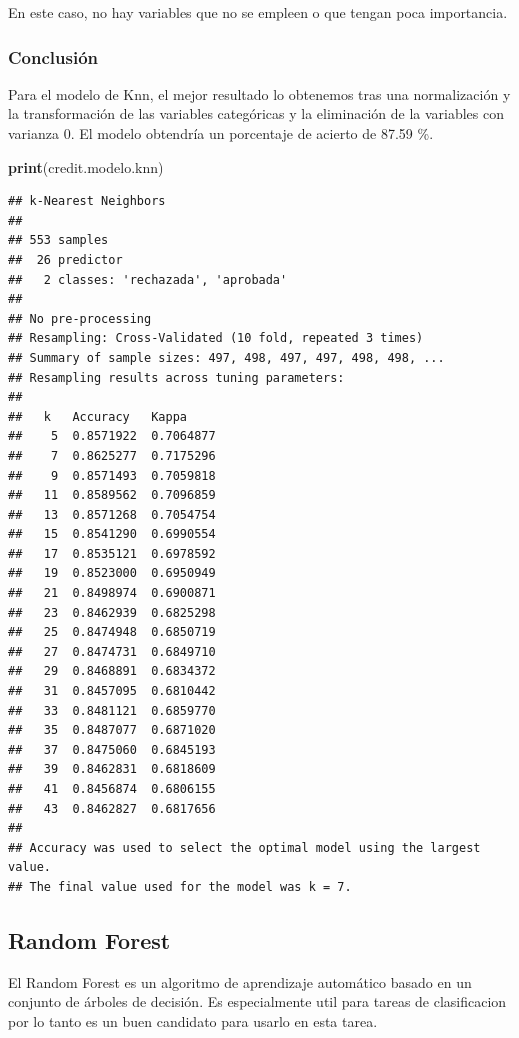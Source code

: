 \documentclass[
]{article}
\newenvironment{Shaded}{\begin{snugshade}}{\end{snugshade}}
\newcommand{\FunctionTok}[1]{\textcolor[rgb]{0.13,0.29,0.53}{\textbf{#1}}}
\newcommand{\NormalTok}[1]{#1}
\begin{document}
En este caso, no hay variables que no se empleen o que tengan poca
importancia.

\hypertarget{conclusiuxf3n-2}{%
\subsubsection{Conclusión}\label{conclusiuxf3n-2}}

Para el modelo de Knn, el mejor resultado lo obtenemos tras una
normalización y la transformación de las variables categóricas y la
eliminación de la variables con varianza 0. El modelo obtendría un
porcentaje de acierto de 87.59 \%.

\begin{Shaded}
\begin{Highlighting}[]
\FunctionTok{print}\NormalTok{(credit.modelo.knn)}
\end{Highlighting}
\end{Shaded}

\begin{verbatim}
## k-Nearest Neighbors 
## 
## 553 samples
##  26 predictor
##   2 classes: 'rechazada', 'aprobada' 
## 
## No pre-processing
## Resampling: Cross-Validated (10 fold, repeated 3 times) 
## Summary of sample sizes: 497, 498, 497, 497, 498, 498, ... 
## Resampling results across tuning parameters:
## 
##   k   Accuracy   Kappa    
##    5  0.8571922  0.7064877
##    7  0.8625277  0.7175296
##    9  0.8571493  0.7059818
##   11  0.8589562  0.7096859
##   13  0.8571268  0.7054754
##   15  0.8541290  0.6990554
##   17  0.8535121  0.6978592
##   19  0.8523000  0.6950949
##   21  0.8498974  0.6900871
##   23  0.8462939  0.6825298
##   25  0.8474948  0.6850719
##   27  0.8474731  0.6849710
##   29  0.8468891  0.6834372
##   31  0.8457095  0.6810442
##   33  0.8481121  0.6859770
##   35  0.8487077  0.6871020
##   37  0.8475060  0.6845193
##   39  0.8462831  0.6818609
##   41  0.8456874  0.6806155
##   43  0.8462827  0.6817656
## 
## Accuracy was used to select the optimal model using the largest value.
## The final value used for the model was k = 7.
\end{verbatim}

\hypertarget{random-forest}{%
\subsection{Random Forest}\label{random-forest}}

El Random Forest es un algoritmo de aprendizaje automático basado en un
conjunto de árboles de decisión. Es especialmente util para tareas de
clasificacion por lo tanto es un buen candidato para usarlo en esta
tarea.
\end{document}
